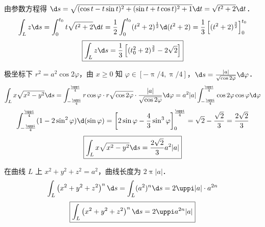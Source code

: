 \begin{solution}

    由参数方程得 $\d s = \sqrt{(\cos t - t \sin t)^{2} + (\sin t + t \cos t)^{2} + 1} \d t = \sqrt{t^{2}+2} \d t$．
    \begin{equation}
        \int_{L} z \d s = \int_{0}^{t_{0}} t \sqrt{t^{2}+2} \d t = \frac{1}{2} \int_{0}^{t_{0}} (t^{2}+2)^{\frac{1}{2}} \d(t^{2}+2) = \frac{1}{3} \left[ (t^{2}+2)^{\frac{3}{2}} \right]_{0}^{t_{0}}
    \end{equation}
    \begin{equation}
        \boxed{\int_{L} z \d s = \frac{1}{3} \left[ (t_{0}^{2}+2)^{\frac{3}{2}} - 2 \sqrt{2} \right]}
    \end{equation}


    极坐标下 $r^{2} = a^{2} \cos 2 \varphi$，由 $x \geqslant 0$ 知 $\varphi \in [-\uppi/4, \uppi/4]$，$\d s = \frac{|a|}{\sqrt{\cos 2 \varphi}} \d \varphi$．
    \begin{equation}
        \int_{L} x \sqrt{x^{2}-y^{2}} \d s = \int_{-\frac{\uppi}{4}}^{\frac{\uppi}{4}} r \cos \varphi \cdot r \sqrt{\cos 2 \varphi} \cdot \frac{|a|}{\sqrt{\cos 2 \varphi}} \d \varphi = a^{2} |a| \int_{-\frac{\uppi}{4}}^{\frac{\uppi}{4}} \cos 2 \varphi \cos \varphi \d \varphi
    \end{equation}
    \begin{equation}
        \int_{-\frac{\uppi}{4}}^{\frac{\uppi}{4}} (1-2\sin^{2} \varphi) \d (\sin \varphi) = \left[ 2 \sin \varphi - \frac{4}{3} \sin^{3} \varphi \right]_{0}^{\frac{\uppi}{4}} = \sqrt{2} - \frac{\sqrt{2}}{3} = \frac{2\sqrt{2}}{3}
    \end{equation}
    \begin{equation}
        \boxed{\int_{L} x \sqrt{x^{2}-y^{2}} \d s = \frac{2 \sqrt{2}}{3} a^{2} |a|}
    \end{equation}


    在曲线 $L$ 上 $x^{2}+y^{2}+z^{2} = a^{2}$，曲线长度为 $2 \uppi |a|$．
    \begin{equation}
        \int_{L}\left(x^{2}+y^{2}+z^{2}\right)^{n} \d s = \int_{L}(a^{2})^{n} \d s = 2 \uppi |a| \cdot a^{2n}
    \end{equation}
    \begin{equation}
        \boxed{\int_{L}\left(x^{2}+y^{2}+z^{2}\right)^{n} \d s = 2 \uppi a^{2n} |a|}
    \end{equation}



\end{solution}

